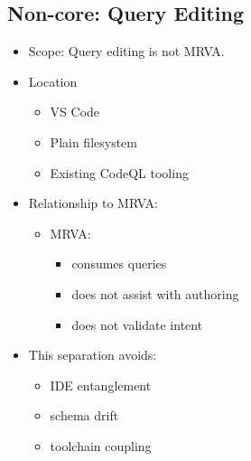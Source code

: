 \documentclass[11pt]{article}
\begin{document}
\subsection{Non-core: Query Editing}
\label{sec:org10625ca}
\begin{itemize}
\item Scope: Query editing is not MRVA.

\item Location
\begin{itemize}
\item VS Code
\item Plain filesystem
\item Existing CodeQL tooling
\end{itemize}

\item Relationship to MRVA:
\begin{itemize}
\item MRVA:
\begin{itemize}
\item consumes queries
\item does not assist with authoring
\item does not validate intent
\end{itemize}
\end{itemize}

\item This separation avoids:
\begin{itemize}
\item IDE entanglement
\item schema drift
\item toolchain coupling
\end{itemize}
\end{itemize}
\end{document}
